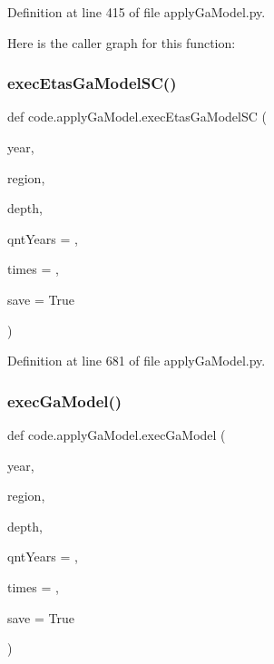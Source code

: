 Definition at line 415 of file apply\+Ga\+Model.\+py.

Here is the caller graph for this function\+:
\mbox{\label{namespacecode_1_1apply_ga_model_a439bc0f7eb30f835b2f4bc458adfde50}} 
\subsubsection{\texorpdfstring{exec\+Etas\+Ga\+Model\+S\+C()}{execEtasGaModelSC()}}
{\footnotesize\ttfamily def code.\+apply\+Ga\+Model.\+exec\+Etas\+Ga\+Model\+SC (\begin{DoxyParamCaption}\item[{}]{year,  }\item[{}]{region,  }\item[{}]{depth,  }\item[{}]{qnt\+Years = {},  }\item[{}]{times = {},  }\item[{}]{save = {\ttfamily True} }\end{DoxyParamCaption})}



Definition at line 681 of file apply\+Ga\+Model.\+py.

\mbox{\label{namespacecode_1_1apply_ga_model_a6b97d26a1e7939bb1cc4a2714e536150}} 
\subsubsection{\texorpdfstring{exec\+Ga\+Model()}{execGaModel()}}
{\footnotesize\ttfamily def code.\+apply\+Ga\+Model.\+exec\+Ga\+Model (\begin{DoxyParamCaption}\item[{}]{year,  }\item[{}]{region,  }\item[{}]{depth,  }\item[{}]{qnt\+Years = {},  }\item[{}]{times = {},  }\item[{}]{save = {\ttfamily True} }\end{DoxyParamCaption})}




